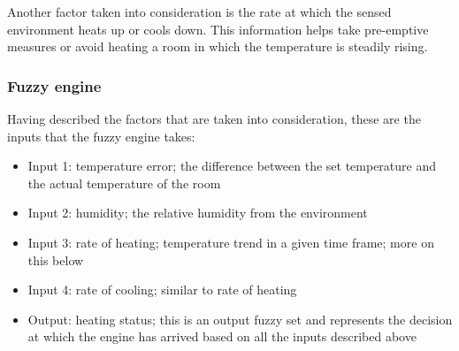 \documentclass[conference]{IEEEtran}
\let\Oldsubsubsection\subsubsection
\renewcommand{\subsubsection}{\FloatBarrier\Oldsubsubsection}
\begin{document}
Another factor taken into consideration is the rate at which the sensed environment heats up or cools down. This
information helps take pre-emptive measures or avoid heating a room in which the temperature is steadily rising.

\subsubsection{Fuzzy engine}
\label{Thermostat fuzzy engine}

Having described the factors that are taken into consideration, these are the inputs that the fuzzy engine takes:\par
\begin{itemize}
\item Input 1: temperature error; the difference between the set temperature and the actual temperature of the room
\item Input 2: humidity; the relative humidity from the environment
\item Input 3: rate of heating; temperature trend in a given time frame; more on this below
\item Input 4: rate of cooling; similar to rate of heating
\item Output: heating status; this is an output fuzzy set and represents the decision at which the engine has arrived
based on all the inputs described above
\end{itemize}
\end{document}
